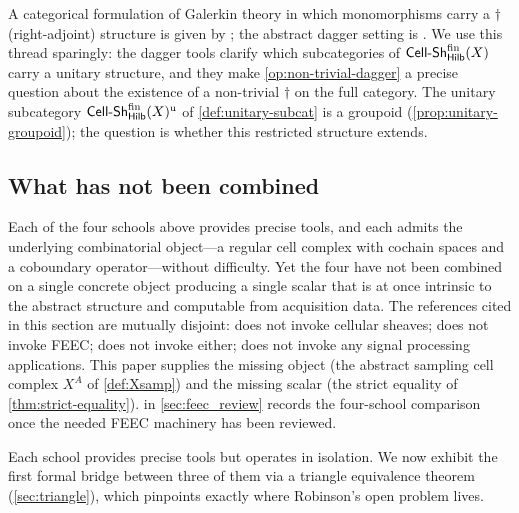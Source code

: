 A categorical formulation of Galerkin theory in which monomorphisms
carry a $\dagger$ (right-adjoint) structure is given by
\cite{LahtinenStenvall2020}; the abstract dagger setting is
\cite{HeunenVicary2019}. We use this thread sparingly: the dagger
tools clarify which subcategories of $\mathsf{Cell\text{-}Sh}^{\mathrm{fin}}_{\mathsf{Hilb}}(X)$
carry a unitary structure, and they make
\cref{op:non-trivial-dagger} a precise question about the existence
of a non-trivial $\dagger$ on the full category. The unitary
subcategory $\mathsf{Cell\text{-}Sh}^{\mathrm{fin}}_{\mathsf{Hilb}}(X)^{\mathrm{u}}$ of
\cref{def:unitary-subcat} is a groupoid
(\cref{prop:unitary-groupoid}); the question is whether this
restricted structure extends.

\subsection{What has not been combined}\label{subsec:related-gap}

Each of the four schools above provides precise tools, and each
admits the underlying combinatorial object---a regular cell complex
with cochain spaces and a coboundary operator---without difficulty.
Yet the four have not been combined on a single concrete object
producing a single scalar that is at once intrinsic to the abstract
structure and computable from acquisition data. The references
cited in this section are mutually disjoint: \cite{AFW2010} does
not invoke cellular sheaves; \cite{HansenGhrist2019} does not
invoke FEEC; \cite{BarbarossaSardellitti2020} does not invoke
either; \cite{LahtinenStenvall2020} does not invoke any signal
processing applications. This paper supplies the missing object
(the abstract sampling cell complex $X^A$ of \cref{def:Xsamp}) and
the missing scalar (the strict equality of
\cref{thm:strict-equality}).  in
\cref{sec:feec_review} records the four-school comparison once the
needed FEEC machinery has been reviewed.

\medskip\noindent
Each school provides precise tools but operates in isolation. We now
exhibit the first formal bridge between three of them via a triangle
equivalence theorem (\cref{sec:triangle}), which pinpoints exactly
where Robinson's open problem lives.
